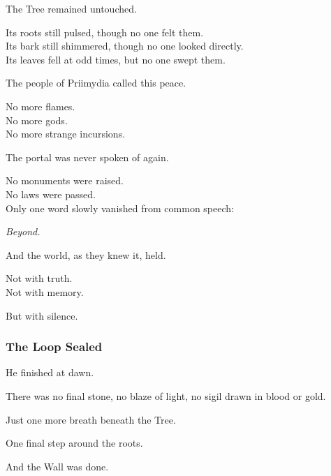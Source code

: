 \documentclass[12pt]{article}
\begin{document}
\vspace{0.5em}
The Tree remained untouched.

\vspace{0.5em}
Its roots still pulsed, though no one felt them.\\
Its bark still shimmered, though no one looked directly.\\
Its leaves fell at odd times, but no one swept them.

\vspace{0.5em}
The people of Priimydia called this peace.

\vspace{0.5em}
No more flames.\\
No more gods.\\
No more strange incursions.

\vspace{0.5em}
The portal was never spoken of again.

\vspace{0.5em}
No monuments were raised.\\
No laws were passed.\\
Only one word slowly vanished from common speech:

\vspace{0.5em}
\textit{Beyond.}

\vspace{0.5em}
And the world, as they knew it, held.

\vspace{0.5em}
Not with truth.\\
Not with memory.

\vspace{0.5em}
But with silence.

\dotfill

\subsubsection{The Loop Sealed}

He finished at dawn.

\vspace{0.5em}
There was no final stone, no blaze of light, no sigil drawn in blood or gold.

\vspace{0.5em}
Just one more breath beneath the Tree.

\vspace{0.5em}
One final step around the roots.

\vspace{0.5em}
And the Wall was done.
\end{document}
